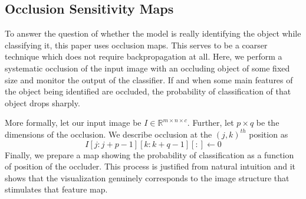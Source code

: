 \subsection{Occlusion Sensitivity Maps}
To answer the question of whether the model is really identifying the object while classifying it, this \cite{occlusion} paper uses occlusion maps. This serves to be a coarser technique which does not require backpropagation at all. Here, we perform a systematic occlusion of the input image with an occluding object of some fixed size and monitor the output of the classifier. If and when some main features of the object being identified are occluded, the probability of classification of that object drops sharply. 

More formally, let our input image be $I \in \mathbb{R}^{m \times n \times c}$. Further, let $p \times q$ be the dimensions of the occlusion. We describe occlusion at the $(j,k)^{th}$ position as
\[I[j:j+p-1][k:k+q-1][:] \leftarrow 0\]
Finally, we prepare a map showing the probability of classification as a function of position of the occluder. This process is justified from natural intuition and it shows
that the visualization genuinely corresponds to the image structure that stimulates that feature map.